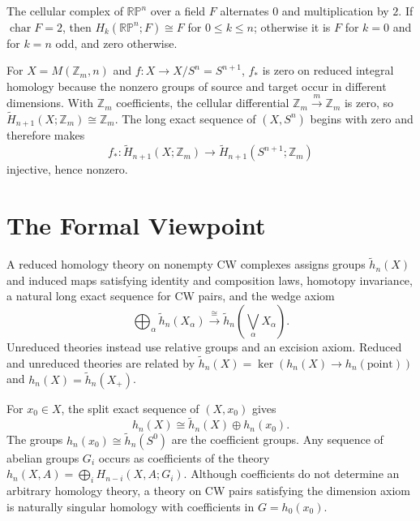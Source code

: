 \begin{example}
\label{ex:homology-rpn-field-coefficients}

The cellular complex of $\mathbb{RP}^n$ over a field $F$ alternates $0$ and multiplication by $2$.  If $\operatorname{char}F=2$, then $H_k(\mathbb{RP}^n;F)\cong F$ for $0\leq k\leq n$; otherwise it is $F$ for $k=0$ and for $k=n$ odd, and zero otherwise.
\end{example}

\begin{example}
\label{ex:homology-moore-space-quotient}

For $X=M(\mathbb{Z}_m,n)$ and $f:X\to X/S^n=S^{n+1}$, $f_*$ is zero on
reduced integral homology because the nonzero groups of source and target occur
in different dimensions. With $\mathbb{Z}_m$ coefficients, the cellular
differential $\mathbb{Z}_m\xrightarrow{m}\mathbb{Z}_m$ is zero, so
$\widetilde H_{n+1}(X;\mathbb{Z}_m)\cong\mathbb{Z}_m$. The long exact sequence
of $(X,S^n)$ begins with zero and therefore makes
\[
f_*:\widetilde H_{n+1}(X;\mathbb{Z}_m)
\longrightarrow\widetilde H_{n+1}(S^{n+1};\mathbb{Z}_m)
\]
injective, hence nonzero.
\end{example}

\section{The Formal Viewpoint}\label{sec:formal-viewpoint}

A reduced homology theory on nonempty CW complexes assigns groups $\widetilde h_n(X)$ and induced maps satisfying identity and composition laws, homotopy invariance, a natural long exact sequence for CW pairs, and the wedge axiom
\[
\bigoplus_\alpha\widetilde h_n(X_\alpha)\xrightarrow{\cong}\widetilde h_n\left(\bigvee_\alpha X_\alpha\right).
\]
Unreduced theories instead use relative groups and an excision axiom.  Reduced and unreduced theories are related by $\widetilde h_n(X)=\ker(h_n(X)\to h_n(\mathrm{point}))$ and $h_n(X)=\widetilde h_n(X_+)$.

For $x_0\in X$, the split exact sequence of $(X,x_0)$ gives
\[
h_n(X)\cong\widetilde h_n(X)\oplus h_n(x_0).
\]
The groups $h_n(x_0)\cong\widetilde h_n(S^0)$ are the coefficient groups.
Any sequence of abelian groups $G_i$ occurs as coefficients of the theory
$h_n(X,A)=\bigoplus_i H_{n-i}(X,A;G_i)$. Although coefficients do not determine
an arbitrary homology theory, a theory on CW pairs satisfying the dimension
axiom is naturally singular homology with coefficients in $G=h_0(x_0)$.

